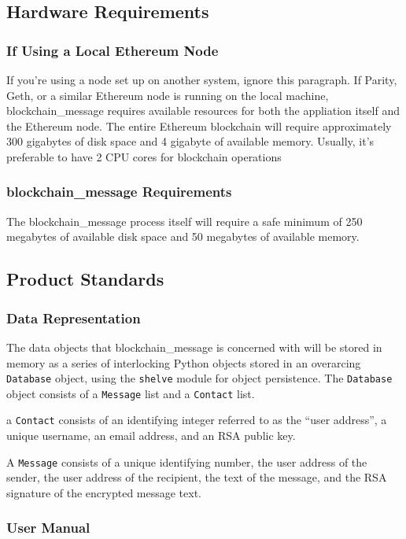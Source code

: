 \documentclass[titlepage]{report}
\begin{document}
\subsection{Hardware Requirements}
\subsubsection{If Using a Local Ethereum Node}
If you're using a node set up on another system, ignore this paragraph. If Parity, Geth, or a similar Ethereum node is running on the local machine, blockchain\_message requires available resources for both the appliation itself and the Ethereum node. The entire Ethereum blockchain will require approximately 300 gigabytes of disk space and 4 gigabyte of available memory. Usually, it's preferable to have 2 CPU cores for blockchain operations

\subsubsection{blockchain\_message Requirements}
The blockchain\_message process itself will require a safe minimum of 250 megabytes of available disk space and 50 megabytes of available memory.

\subsection{Product Standards}
\subsubsection{Data Representation}
The data objects that blockchain\_message is concerned with will be stored in memory as a series of interlocking Python objects stored in an overarcing \texttt{Database} object, using the \texttt{shelve} module for object persistence. The \texttt{Database} object consists of a \texttt{Message} list and a \texttt{Contact} list.

a \texttt{Contact} consists of an identifying integer referred to as the ``user address'', a unique username, an email address, and an RSA public key.

A \texttt{Message} consists of a unique identifying number, the user address of the sender, the user address of the recipient, the text of the message, and the RSA signature of the encrypted message text.

\subsubsection{User Manual}
\end{document}
